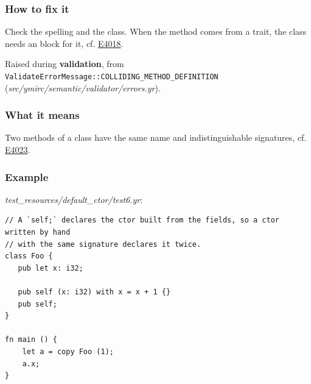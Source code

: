 \subsubsection*{How to fix it}

Check the spelling and the class. When the method comes from a trait, the class needs an  block for it, cf. \hyperref[sec:codes:e4018]{E4018}.

\label{sec:codes:e4024}

Raised during \textbf{validation}, from \texttt{ValidateErrorMessage::\allowbreak{}COLLIDING\_\allowbreak{}METHOD\_\allowbreak{}DEFINITION} (\textit{src/\allowbreak{}ymirc/\allowbreak{}semantic/\allowbreak{}validator/\allowbreak{}errors.yr}).

\subsubsection*{What it means}

Two methods of a class have the same name and indistinguishable signatures, cf. \hyperref[sec:codes:e4023]{E4023}.

\subsubsection*{Example}

\textit{test\_\allowbreak{}resources/\allowbreak{}default\_\allowbreak{}ctor/\allowbreak{}test6.yr}:

\begin{lstlisting}[style=coloredverbatimError]
// A `self;` declares the ctor built from the fields, so a ctor written by hand
// with the same signature declares it twice.
class Foo {
   pub let x: i32;

   pub self (x: i32) with x = x + 1 {}
   pub self;
}

fn main () {
    let a = copy Foo (1);
    a.x;
}
\end{lstlisting}

